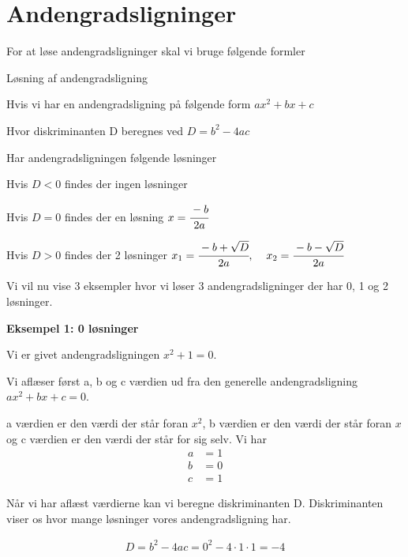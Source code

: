 \section*{Andengradsligninger}

For at løse andengradsligninger skal vi bruge følgende formler

\begin{frm-thm}{Løsning af andengradsligning}

Hvis vi har en andengradsligning på følgende form \hspace*{2cm} $ax^2 + bx + c$

Hvor diskriminanten D beregnes ved \hspace*{4.2cm} $D = b^2 -4ac$

Har andengradsligningen følgende løsninger

\vspace*{4mm}

Hvis $D < 0$ findes der ingen løsninger

Hvis $D = 0$ findes der en løsning \hspace*{4.7cm} $x = \cfrac{-b}{2a}$

Hvis $D > 0$ findes der 2 løsninger \hspace*{4.6cm} $x_1 = \cfrac{-b + \sqrt{D}}{2a}, \hspace*{4mm} x_2 = \cfrac{-b - \sqrt{D}}{2a}$

\end{frm-thm}

Vi vil nu vise 3 eksempler hvor vi løser 3 andengradsligninger der har 0, 1 og 2 løsninger.

\textbf{Eksempel 1: 0 løsninger}

Vi er givet andengradsligningen $x^2 + 1 = 0$.

Vi aflæser først a, b og c værdien ud fra den generelle andengradsligning $ax^2 + bx + c = 0$.

a værdien er den værdi der står foran $x^2$, b værdien er den værdi der står foran $x$ og c værdien er den værdi der står for sig selv. Vi har
\begin{align*}
a &= 1\\
b &= 0\\
c &= 1
\end{align*}

Når vi har aflæst værdierne kan vi beregne diskriminanten D. Diskriminanten viser os hvor mange løsninger vores andengradsligning har.

\begin{align*}
D = b^2 - 4ac = 0^2 - 4 \cdot 1 \cdot 1 = -4
\end{align*}

